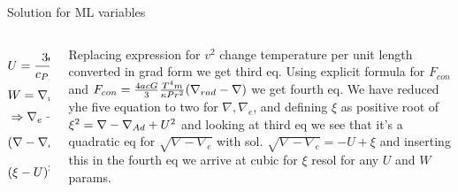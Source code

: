 \begin{wordonframe}{Solution for ML variables}
    \begin{columns}[T]
        \begin{column}{0.5\textwidth}
            \begin{align*}
                &U=\frac{3acT^3}{c_P\rho^2\kappa l_m^2}\sqrt{\frac{8H_P}{g\delta}}\propto\alpha^{-2}H_P^{-\frac{3}{2}}\\
                &W=\nabla_{rad}{}-\nabla_{Ad}{}\\
                &\Rightarrow\nabla_e-\nabla_{Ad}{}=\nabla-\nabla_{Ad}{}-(\nabla-\nabla_e)=2U\sqrt{\nabla-\nabla_e}\\
                &(\nabla-\nabla_e)^{\frac{3}{2}}=\frac{8}{9}U(\nabla_{rad}{}-\nabla)\\
                &(\xi-U)^3+\frac{8U}{9}(\xi^2-U^2-W)=0
            \end{align*}
        \end{column}
        \begin{column}{0.4\textwidth}
            Replacing expression for $v^2$ change temperature per unit length converted in grad form we get third eq. Using explicit formula for $F_{con}$ and $F_{con}=\frac{4acG}{3}\frac{T^4m}{\kappa Pr^2}(\nabla_{rad}{}-\nabla)$ we get fourth eq. We have reduced yhe five equation to two for $\nabla, \nabla_e$, and defining  $\xi$ as positive root of $\xi^2=\nabla-\nabla_{Ad}{}+U^2$ and looking at third eq we see that it's a quadratic eq for $\sqrt{\nabla-\nabla_e}$ with sol. $\sqrt{\nabla-\nabla_e}=-U+\xi$ and inserting this in the fourth eq we arrive at cubic for $\xi$ resol for any $U$ and $W$ params.
        \end{column}
    \end{columns}
    
\end{wordonframe}


